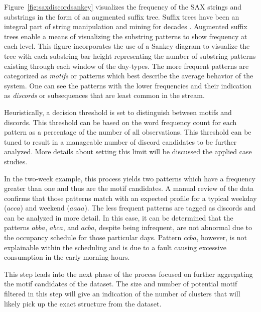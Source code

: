 Figure~\ref{fig:saxdiscordsankey} visualizes the frequency of the SAX strings and substrings in the form of an augmented suffix tree. Suffix trees have been an integral part of string manipulation and mining for decades \citep{weiner_linear_1973}. Augmented suffix trees enable a means of visualizing the substring patterns to show frequency at each level. This figure incorporates the use of a Sankey diagram to visualize the tree with each substring bar height representing the number of substring patterns existing through each window of the day-types. The more frequent patterns are categorized as \emph{motifs} or patterns which best describe the average behavior of the system. One can see the patterns with the lower frequencies and their indication as \emph{discords} or subsequences that are least common in the stream.  

Heuristically, a decision threshold is set to distinguish between motifs and discords. This threshold can be based on the word frequency count for each pattern as a percentage of the number of all observations. This threshold can be tuned to result in a manageable number of discord candidates to be further analyzed. More details about setting this limit will be discussed the applied case studies.


In the two-week example, this process yields two patterns which have a frequency greater than one and thus are the motif candidates. A manual review of the data confirms that those patterns match with an expected profile for a typical weekday ($acca$) and weekend ($aaaa$). The less frequent patterns are tagged as discords and can be analyzed in more detail. In this case, it can be determined that the patterns $abba$, $abca$, and $acba$, despite being infrequent, are not abnormal due to the occupancy schedule for those particular days. Pattern $ccba$, however, is not explainable within the scheduling and is due to a fault causing excessive consumption in the early morning hours.

This step leads into the next phase of the process focused on further aggregating the motif candidates of the dataset. The size and number of potential motif filtered in this step will give an indication of the number of clusters that will likely pick up the exact structure from the dataset.

